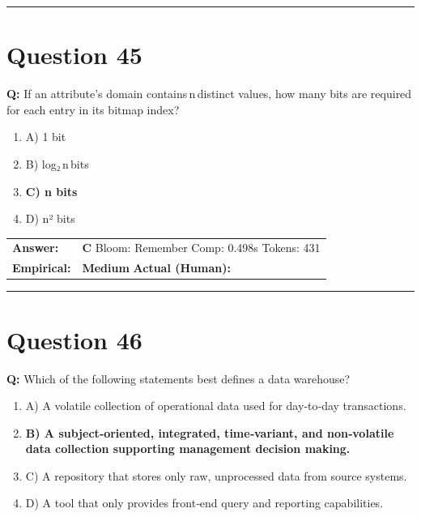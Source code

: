 \documentclass[9pt]{article}
\begin{document}
\vspace{0.2cm}
\rule{\textwidth}{0.4pt}
\vspace{0.2cm}


\section*{Question 45}

\textbf{Q:} If an attribute’s domain contains n distinct values, how many bits are required for each entry in its bitmap index?

\begin{enumerate}[label=\textbf{\alph{*})}, nosep]
    \item A) 1 bit
    \item B) log₂ n bits
    \item \textbf{C) n bits} %
    \item D) n² bits

\end{enumerate}

\begin{tabular}{@{}l p{10.5cm}@{}}
\textbf{Answer:} & \textbf{C} \hspace{1em} Bloom: Remember \hspace{1em} Comp: 0.498s \hspace{1em} Tokens: 431 \\
\textbf{Empirical:} & \textbf{Medium} \hspace{1em} \textbf{Actual (Human):} \underline{\hspace{5cm}}
\end{tabular}

\vspace{0.2cm}
\rule{\textwidth}{0.4pt}
\vspace{0.2cm}


\section*{Question 46}

\textbf{Q:} Which of the following statements best defines a data warehouse?

\begin{enumerate}[label=\textbf{\alph{*})}, nosep]
    \item A) A volatile collection of operational data used for day‑to‑day transactions.
    \item \textbf{B) A subject‑oriented, integrated, time‑variant, and non‑volatile data collection supporting management decision making.} %
    \item C) A repository that stores only raw, unprocessed data from source systems.
    \item D) A tool that only provides front‑end query and reporting capabilities.

\end{enumerate}
\end{document}
